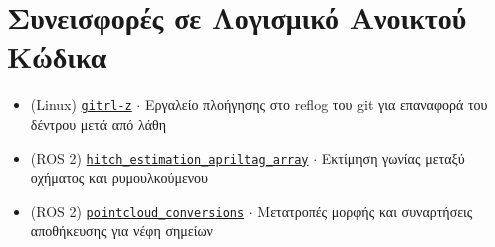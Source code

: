 \documentclass[a4paper,10pt,twoside]{article}
\begin{document}
\verticalspacebetweensections

\section{\textbf{Συνεισφορές σε Λογισμικό Ανοικτού Κώδικα}}\verticalspacebetweensectionandcontent

  \noindent\begin{minipage}[t]{\textwidth}
    \begin{itemize}
      \item (Linux) \href{https://github.com/li9i/gitrl-z}{\texttt{gitrl-z}} $\cdot$ Εργαλείο πλοήγησης στο reflog του git για επαναφορά του δέντρου μετά από λάθη\verticalspaceafteritem
      \item (ROS 2) \href{https://index.ros.org/p/hitch_estimation_apriltag_array/#humble}{\texttt{hitch\_estimation\_apriltag\_array}} $\cdot$ Εκτίμηση γωνίας μεταξύ οχήματος και ρυμουλκούμενου \verticalspaceafteritem
      \item (ROS 2) \href{https://index.ros.org/r/pointcloud_conversions/#lyrical}{\texttt{pointcloud\_conversions}} $\cdot$ Μετατροπές μορφής και συναρτήσεις αποθήκευσης για νέφη σημείων
    \end{itemize}
  \end{minipage} \\ [0.2em]

\verticalspacebetweensections

\end{document}
